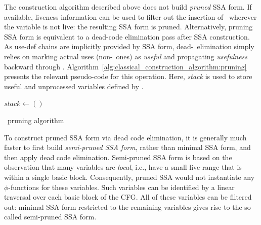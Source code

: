 {The construction algorithm described above does not
build \emph{pruned} SSA form.
If available, liveness information can be used to filter out the 
insertion of \phifuns\ wherever the variable is not live:
the resulting SSA form is pruned.
Alternatively, 
pruning SSA form is equivalent to a dead-code elimination pass
after SSA construction.
As use-def chains are implicitly provided by SSA form, 
dead-\phifun\ elimination simply relies on marking actual uses 
(non-\phifun\ ones) as \emph{useful} and propagating 
\emph{usefulness} backward through \phifuns.
Algorithm~\ref{alg:classical_construction_algorithm:pruning} 
presents the relevant pseudo-code for this operation. Here, \textit{stack} is used to store useful and unprocessed variables defined by \phifuns. 

\begin{algorithm}[h]
$\textit{stack} \leftarrow ()$\;
\caption{\phifun\ pruning algorithm}
\label{alg:classical_construction_algorithm:pruning}
\end{algorithm}

To construct pruned SSA form via dead code elimination,
it is generally much faster to first build \emph{semi-pruned SSA
form}, rather than minimal SSA form, and then apply
dead code elimination.
Semi-pruned SSA form is based on the observation that
many variables are \emph{local}, i.e., have a small live-range that is
within a single basic block. Consequently, pruned SSA would not 
instantiate any $\phi$-functions for these variables.
Such variables can be identified by a linear traversal
over each basic block of the CFG. 
All of these variables
can be filtered out: minimal SSA form restricted to the remaining variables gives rise to the so called semi-pruned SSA form.




}
